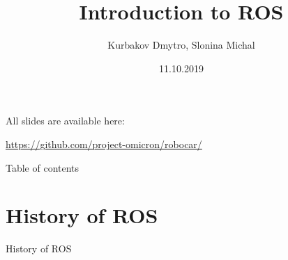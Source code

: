 \documentclass{beamer}
\begin{document}
\title{Introduction to ROS} 
\author{Kurbakov Dmytro, Slonina Michal}

\date{11.10.2019}

\begin{frame}
\titlepage
\end{frame}

\begin{frame}
All slides are available here:

\url{https://github.com/project-omicron/robocar/}
\end{frame}

\begin{frame}{Table of contents}
\tableofcontents
\end{frame}

\section{History of ROS} 
\begin{frame}
\begin{center}
\Huge History of ROS
\end{center}
\end{frame}
\end{document}
